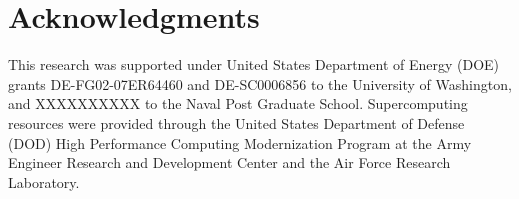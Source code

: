 \section{Acknowledgments}

This research was supported under United States Department of Energy (DOE) grants DE-FG02-07ER64460 and DE-SC0006856 to the University of Washington, and XXXXXXXXXX to the Naval Post Graduate School.
Supercomputing resources were provided through the United States Department of Defense (DOD) High Performance Computing Modernization Program at the Army Engineer Research and Development Center and the Air Force Research Laboratory.